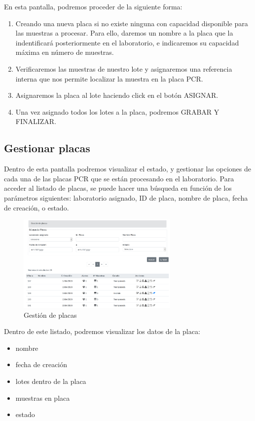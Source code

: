 \documentclass[a4paper,spanish]{paper}
\begin{document}
En esta pantalla, podremos proceder de la siguiente forma:

\begin{enumerate}
    \item Creando una nueva placa si no existe ninguna con capacidad disponible para las muestras a procesar. Para ello, daremos un nombre a la placa que la indentificará posteriormente en el laboratorio, e indicaremos su capacidad máxima en número de muestras.
    \item Verificaremos las muestras de nuestro lote y asignaremos una referencia interna que nos permite localizar la muestra en la placa PCR.
    \item Asignaremos la placa al lote haciendo click en el botón ASIGNAR.
    \item Una vez asignado todos los lotes a la placa, podremos GRABAR Y FINALIZAR.
\end{enumerate}

\subsection{Gestionar placas}

Dentro de esta pantalla podremos visualizar el estado, y gestionar las opciones de cada una de las placas PCR que se están procesando en el laboratorio. Para acceder al listado de placas, se puede hacer una búsqueda en función de los parámetros siguientes: laboratorio asignado, ID de placa, nombre de placa, fecha de creación, o estado.

\begin{figure}[h]
\centering
\includegraphics[width=0.7\textwidth]{Figs/Fig19.png}
\caption{Gestión de placas}
\label{Fig19}
\end{figure}

Dentro de este listado, podremos visualizar los datos de la placa:

\begin{itemize}
    \item nombre
    \item fecha de creación
    \item lotes dentro de la placa
    \item muestras en placa
    \item estado
\end{itemize}
\end{document}
